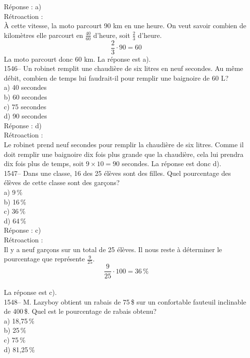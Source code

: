 R\'eponse : a)\\

R\'etroaction :\\
\`A cette vitesse, la moto parcourt 90 km en une heure. On veut
savoir combien de kilom\`etres elle parcourt en $\frac{40}{60}$
d'heure, soit $\frac{2}{3}$ d'heure.
$$ \frac{2}{3}\cdot 90=60$$ La moto parcourt donc 60
km. La r\'eponse est a).\\

1546-- Un robinet remplit une chaudi\`ere de six litres en neuf
secondes. Au m\^eme d\'ebit, combien de temps lui faudrait-il pour
remplir une baignoire
de 60 L?\\
a) 40 secondes\\
b) 60 secondes\\
c) 75 secondes\\
d) 90 secondes\\

R\'eponse : d)\\

R\'etroaction :\\
Le robinet prend neuf secondes pour remplir la chaudi\`ere de six
litres. Comme il doit remplir une baignoire dix fois plus grande que
la chaudi\`ere, cela lui prendra dix
fois plus de temps, soit $9\times 10=90$ secondes. La r\'eponse est donc
d).\\

1547-- Dans une classe, 16 des 25 \'el\`eves sont des filles. Quel
pourcentage des \'el\`eves de cette classe sont des gar\c cons?\\
a) 9\,\% \\
b) 16\,\% \\
c) 36\,\% \\
d) 64\,\% \\

R\'eponse : c)\\

R\'etroaction :\\
Il y a neuf gar\c cons sur un total de 25 \'el\`eves. Il nous reste
\`a d\'eterminer le pourcentage que repr\'esente $\frac{9}{25}.$
$$\frac{9}{25}\cdot 100=36\,\%$$\\
La r\'eponse est c).\\

1548-- M. Lazyboy obtient un rabais de 75\,\$ sur un confortable
fauteuil inclinable de
400\,\$. Quel est le pourcentage de rabais obtenu?\\
a) 18,75\,\%\\
b) 25\,\% \\
c) 75\,\%\\
d) 81,25\,\%\\

